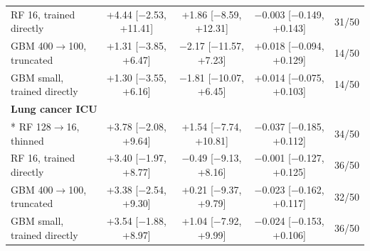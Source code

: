 {\begin{longtable}{lcccc}
\quad RF 16, trained directly & +4.44 [$-$2.53, +11.41] & +1.86 [$-$8.59, +12.31] & $-$0.003 [$-$0.149, +0.143] & 31/50 \\
\quad GBM 400$\rightarrow$100, truncated & +1.31 [$-$3.85, +6.47] & $-$2.17 [$-$11.57, +7.23] & +0.018 [$-$0.094, +0.129] & 14/50 \\
\quad GBM small, trained directly & +1.30 [$-$3.55, +6.16] & $-$1.81 [$-$10.07, +6.45] & +0.014 [$-$0.075, +0.103] & 14/50 \\
\midrule
\multicolumn{5}{l}{\textbf{Lung cancer ICU}} \\*
\quad RF 128$\rightarrow$16, thinned & +3.78 [$-$2.08, +9.64] & +1.54 [$-$7.74, +10.81] & $-$0.037 [$-$0.185, +0.112] & 34/50 \\
\quad RF 16, trained directly & +3.40 [$-$1.97, +8.77] & $-$0.49 [$-$9.13, +8.16] & $-$0.001 [$-$0.127, +0.125] & 36/50 \\
\quad GBM 400$\rightarrow$100, truncated & +3.38 [$-$2.54, +9.30] & +0.21 [$-$9.37, +9.79] & $-$0.023 [$-$0.162, +0.117] & 32/50 \\
\quad GBM small, trained directly & +3.54 [$-$1.88, +8.97] & +1.04 [$-$7.92, +9.99] & $-$0.024 [$-$0.153, +0.106] & 36/50 \\
\bottomrule
\end{longtable}}
